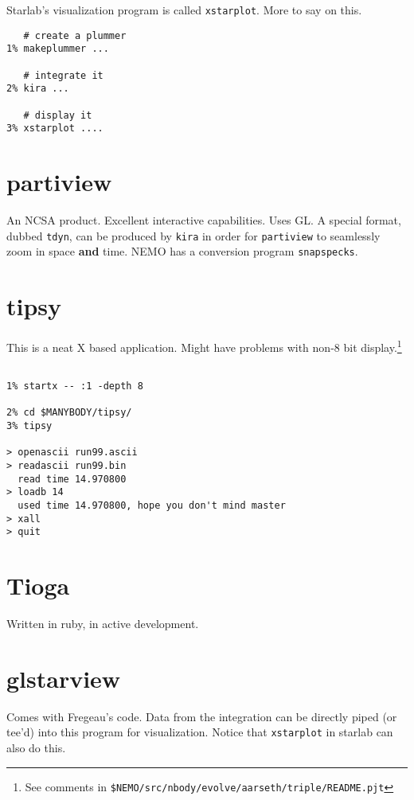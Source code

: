 \begin{itemize}
\begin{itemize}
Starlab's visualization program is called {\tt xstarplot}. More to say on this.

\footnotesize\begin{verbatim}
   # create a plummer
1% makeplummer ...

   # integrate it
2% kira ...

   # display it
3% xstarplot ....
\end{verbatim}\normalsize

\section{partiview}

An NCSA product. Excellent interactive capabilities. Uses GL. A special
format, dubbed {\tt tdyn}, can be produced by {\tt kira} in order for
{\tt partiview} to seamlessly zoom in space {\bf and} time. NEMO has
a conversion program {\tt snapspecks}.

\section{tipsy}

This is a neat X based application. Might have problems with non-8 bit 
display.\footnote{See comments in {\tt \$NEMO/src/nbody/evolve/aarseth/triple/README.pjt}}

\footnotesize\begin{verbatim}

1% startx -- :1 -depth 8

2% cd $MANYBODY/tipsy/
3% tipsy

> openascii run99.ascii
> readascii run99.bin
  read time 14.970800
> loadb 14
  used time 14.970800, hope you don't mind master
> xall
> quit
\end{verbatim}\normalsize



\section{Tioga}

Written in ruby, in active development.

\section{glstarview}

Comes with Fregeau's code. Data from the integration can be directly  piped
(or tee'd) into this program for visualization. Notice that {\tt xstarplot}
in starlab can also do this.


\end{itemize}
\end{itemize}
